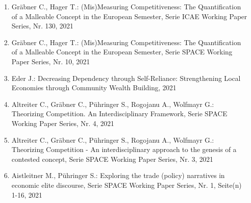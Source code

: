 \begin{enumerate}
	 \item Gräbner C., Hager T.: (Mis)Measuring Competitiveness: The Quantification of a Malleable Concept in the European Semester, Serie ICAE Working Paper Series, Nr. 130, 2021
	 \item Gräbner C., Hager T.: (Mis)Measuring Competitiveness: The Quantification of a Malleable Concept in the European Semester, Serie SPACE Working Paper Series, Nr. 10, 2021
	 \item Eder J.: Decreasing Dependency through Self-Reliance: Strengthening Local Economies through Community Wealth Building, 2021
	 \item Altreiter C., Gräbner C., Pühringer S., Rogojanu A., Wolfmayr G.: Theorizing Competition. An Interdisciplinary Framework, Serie SPACE Working Paper Series, Nr. 4, 2021
	 \item Altreiter C., Gräbner C., Pühringer S., Rogojanu A., Wolfmayr G.: Theorizing Competition - An interdisciplinary approach to the genesis of a contested concept, Serie SPACE Working Paper Series, Nr. 3, 2021
	 \item Aistleitner M., Pühringer S.: Exploring the trade (policy) narratives in economic elite discourse, Serie SPACE Working Paper Series, Nr. 1, Seite(n) 1-16, 2021
\end{enumerate}
